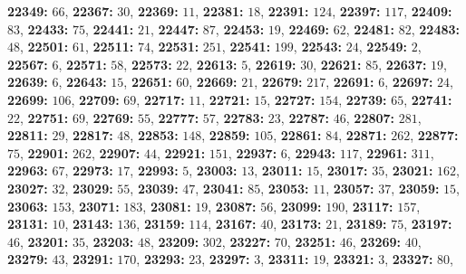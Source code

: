 \textsf{\bfseries 22349:} $66$, \textsf{\bfseries 22367:} $30$, \textsf{\bfseries 22369:} $11$, \textsf{\bfseries 22381:} $18$, \textsf{\bfseries 22391:} $124$, \textsf{\bfseries 22397:} $117$, \textsf{\bfseries 22409:} $83$, \textsf{\bfseries 22433:} $75$, \textsf{\bfseries 22441:} $21$, \textsf{\bfseries 22447:} $87$, \textsf{\bfseries 22453:} $19$, \textsf{\bfseries 22469:} $62$, \textsf{\bfseries 22481:} $82$, \textsf{\bfseries 22483:} $48$, \textsf{\bfseries 22501:} $61$, \textsf{\bfseries 22511:} $74$, \textsf{\bfseries 22531:} $251$, \textsf{\bfseries 22541:} $199$, \textsf{\bfseries 22543:} $24$, \textsf{\bfseries 22549:} $2$, \textsf{\bfseries 22567:} $6$, \textsf{\bfseries 22571:} $58$, \textsf{\bfseries 22573:} $22$, \textsf{\bfseries 22613:} $5$, \textsf{\bfseries 22619:} $30$, \textsf{\bfseries 22621:} $85$, \textsf{\bfseries 22637:} $19$, \textsf{\bfseries 22639:} $6$, \textsf{\bfseries 22643:} $15$, \textsf{\bfseries 22651:} $60$, \textsf{\bfseries 22669:} $21$, \textsf{\bfseries 22679:} $217$, \textsf{\bfseries 22691:} $6$, \textsf{\bfseries 22697:} $24$, \textsf{\bfseries 22699:} $106$, \textsf{\bfseries 22709:} $69$, \textsf{\bfseries 22717:} $11$, \textsf{\bfseries 22721:} $15$, \textsf{\bfseries 22727:} $154$, \textsf{\bfseries 22739:} $65$, \textsf{\bfseries 22741:} $22$, \textsf{\bfseries 22751:} $69$, \textsf{\bfseries 22769:} $55$, \textsf{\bfseries 22777:} $57$, \textsf{\bfseries 22783:} $23$, \textsf{\bfseries 22787:} $46$, \textsf{\bfseries 22807:} $281$, \textsf{\bfseries 22811:} $29$, \textsf{\bfseries 22817:} $48$, \textsf{\bfseries 22853:} $148$, \textsf{\bfseries 22859:} $105$, \textsf{\bfseries 22861:} $84$, \textsf{\bfseries 22871:} $262$, \textsf{\bfseries 22877:} $75$, \textsf{\bfseries 22901:} $262$, \textsf{\bfseries 22907:} $44$, \textsf{\bfseries 22921:} $151$, \textsf{\bfseries 22937:} $6$, \textsf{\bfseries 22943:} $117$, \textsf{\bfseries 22961:} $311$, \textsf{\bfseries 22963:} $67$, \textsf{\bfseries 22973:} $17$, \textsf{\bfseries 22993:} $5$, \textsf{\bfseries 23003:} $13$, \textsf{\bfseries 23011:} $15$, \textsf{\bfseries 23017:} $35$, \textsf{\bfseries 23021:} $162$, \textsf{\bfseries 23027:} $32$, \textsf{\bfseries 23029:} $55$, \textsf{\bfseries 23039:} $47$, \textsf{\bfseries 23041:} $85$, \textsf{\bfseries 23053:} $11$, \textsf{\bfseries 23057:} $37$, \textsf{\bfseries 23059:} $15$, \textsf{\bfseries 23063:} $153$, \textsf{\bfseries 23071:} $183$, \textsf{\bfseries 23081:} $19$, \textsf{\bfseries 23087:} $56$, \textsf{\bfseries 23099:} $190$, \textsf{\bfseries 23117:} $157$, \textsf{\bfseries 23131:} $10$, \textsf{\bfseries 23143:} $136$, \textsf{\bfseries 23159:} $114$, \textsf{\bfseries 23167:} $40$, \textsf{\bfseries 23173:} $21$, \textsf{\bfseries 23189:} $75$, \textsf{\bfseries 23197:} $46$, \textsf{\bfseries 23201:} $35$, \textsf{\bfseries 23203:} $48$, \textsf{\bfseries 23209:} $302$, \textsf{\bfseries 23227:} $70$, \textsf{\bfseries 23251:} $46$, \textsf{\bfseries 23269:} $40$, \textsf{\bfseries 23279:} $43$, \textsf{\bfseries 23291:} $170$, \textsf{\bfseries 23293:} $23$, \textsf{\bfseries 23297:} $3$, \textsf{\bfseries 23311:} $19$, \textsf{\bfseries 23321:} $3$, \textsf{\bfseries 23327:} $80$, 
